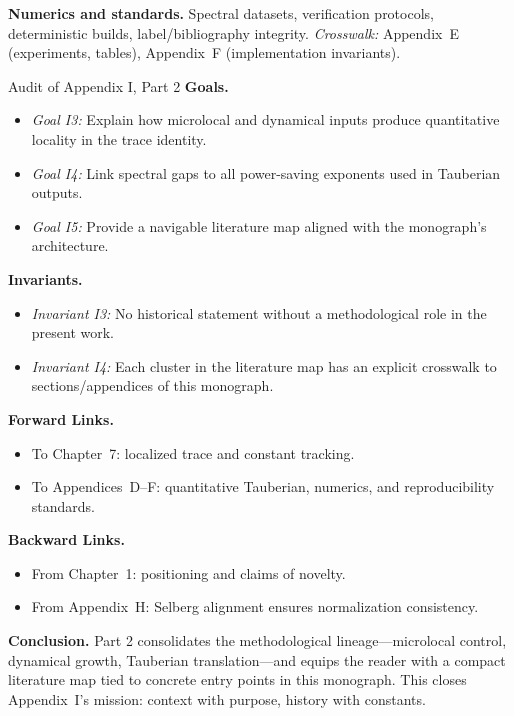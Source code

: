 \medskip\noindent
\textbf{Numerics and standards.}
Spectral datasets, verification protocols, deterministic builds, label/bibliography integrity.  
\emph{Crosswalk:} Appendix~E (experiments, tables), Appendix~F (implementation invariants).

\begin{auditblock}{Audit of Appendix I, Part 2}
\noindent\textbf{Goals.}
\begin{itemize}
  \item \emph{Goal I3:} Explain how microlocal and dynamical inputs produce quantitative locality in the trace identity. 
  \item \emph{Goal I4:} Link spectral gaps to all power-saving exponents used in Tauberian outputs. 
  \item \emph{Goal I5:} Provide a navigable literature map aligned with the monograph’s architecture.
\end{itemize}

\noindent\textbf{Invariants.}
\begin{itemize}
  \item \emph{Invariant I3:} No historical statement without a methodological role in the present work.
  \item \emph{Invariant I4:} Each cluster in the literature map has an explicit crosswalk to sections/appendices of this monograph.
\end{itemize}

\noindent\textbf{Forward Links.}
\begin{itemize}
  \item To Chapter~7: localized trace and constant tracking.
  \item To Appendices~D–F: quantitative Tauberian, numerics, and reproducibility standards.
\end{itemize}

\noindent\textbf{Backward Links.}
\begin{itemize}
  \item From Chapter~1: positioning and claims of novelty.
  \item From Appendix~H: Selberg alignment ensures normalization consistency.
\end{itemize}
\end{auditblock}

\bigskip
\noindent\textbf{Conclusion.}
Part 2 consolidates the methodological lineage—microlocal control, dynamical growth, Tauberian translation—and equips the reader with a compact literature map tied to concrete entry points in this monograph. This closes Appendix~I’s mission: context with purpose, history with constants.
